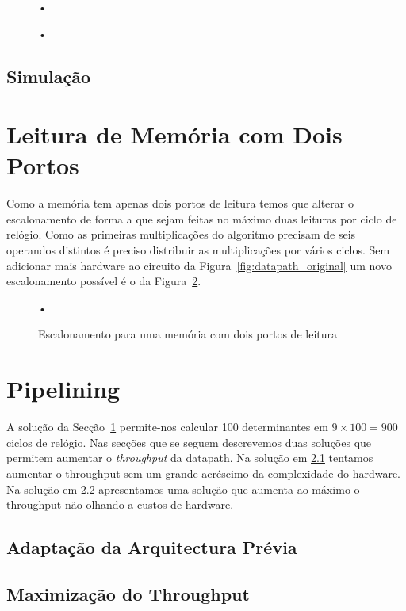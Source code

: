 \documentclass[a4paper]{article}
\begin{document}
\begin{figure}[h]
	\centering
	•
	\caption{•}
	\label{fig:statemachine}
\end{figure}

\subsection{Simulação}

\section{Leitura de Memória com Dois Portos}
\label{sec:leitura_mem_2portos}

Como a memória tem apenas dois portos de leitura temos que alterar o escalonamento de forma a que sejam feitas no máximo duas leituras por ciclo de relógio. Como as primeiras multiplicações do algoritmo precisam de seis operandos distintos é preciso distribuir as multiplicações por vários ciclos. Sem adicionar mais hardware ao circuito da Figura~\ref{fig:datapath_original} um novo escalonamento possível é o da Figura~\ref{fig:scheduling_2portRAM_basic}.

\begin{figure}[h]
	\centering
	•
	\caption{Escalonamento para uma memória com dois portos de leitura}
	\label{fig:scheduling_2portRAM_basic}
\end{figure}

\section{Pipelining}

A solução da Secção~\ref{sec:leitura_mem_2portos} permite-nos calcular 100 determinantes em $ 9 \times 100 = 900 $ ciclos de relógio. Nas secções que se seguem descrevemos duas soluções que permitem aumentar o \textit{throughput} da datapath. Na solução em \ref{subsec:arqui_2portRAM_pipelined_lessHW} tentamos aumentar o throughput sem um grande acréscimo da complexidade do hardware. Na solução em \ref{subsec:arqui_2portRAM_maxthroughput} apresentamos uma solução que aumenta ao máximo o throughput não olhando a custos de hardware.

\subsection{Adaptação da Arquitectura Prévia}
\label{subsec:arqui_2portRAM_pipelined_lessHW}

\pagebreak
\subsection{Maximização do Throughput}
\label{subsec:arqui_2portRAM_maxthroughput}

\end{document}
